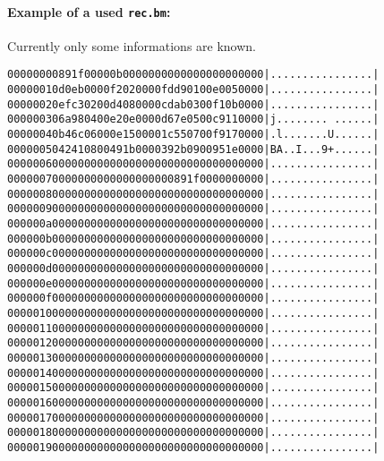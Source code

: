 \documentclass{scrartcl}
\begin{document}
\paragraph{Example of a used \texttt{rec.bm}:} Currently only some
informations are known.

{\small
\begin{alltt}
00000000  \textcolor{unknown}{89 1f 00 00} 0b 00 00 00  00 00 00 00 00 00 00 00  |................|
00000010  d0 eb 00 00 f2 02 00 00  fd d9 01 00 e0 05 00 00  |................|
00000020  ef c3 02 00 d4 08 00 00  cd ab 03 00 f1 0b 00 00  |................|
00000030  6a 98 04 00 e2 0e 00 00  d6 7e 05 00 c9 11 00 00  |j........~......|
00000040  b4 6c 06 00 0e 15 00 00  1c 55 07 00 f9 17 00 00  |.l.......U......|
00000050  42 41 08 00 49 1b 00 00  39 2b 09 00 95 1e 00 00  |BA..I...9+......|
00000060  00 00 00 00 00 00 00 00  00 00 00 00 00 00 00 00  |................|
00000070  00 00 00 00 00 00 00 00  00 \textcolor{unknown}{89 1f 00 00} 00 00 00  |................|
00000080  00 00 00 00 00 00 00 00  00 00 00 00 00 00 00 00  |................|
00000090  00 00 00 00 00 00 00 00  00 00 00 00 00 00 00 00  |................|
000000a0  00 00 00 00 00 00 00 00  00 00 00 00 00 00 00 00  |................|
000000b0  00 00 00 00 00 00 00 00  00 00 00 00 00 00 00 00  |................|
000000c0  00 00 00 00 00 00 00 00  00 00 00 00 00 00 00 00  |................|
000000d0  00 00 00 00 00 00 00 00  00 00 00 00 00 00 00 00  |................|
000000e0  00 00 00 00 00 00 00 00  00 00 00 00 00 00 00 00  |................|
000000f0  00 00 00 00 00 00 00 00  00 00 00 00 00 00 00 00  |................|
00000100  00 00 00 00 00 00 00 00  00 00 00 00 00 00 00 00  |................|
00000110  00 00 00 00 00 00 00 00  00 00 00 00 00 00 00 00  |................|
00000120  00 00 00 00 00 00 00 00  00 00 00 00 00 00 00 00  |................|
00000130  00 00 00 00 00 00 00 00  00 00 00 00 00 00 00 00  |................|
00000140  00 00 00 00 00 00 00 00  00 00 00 00 00 00 00 00  |................|
00000150  00 00 00 00 00 00 00 00  00 00 00 00 00 00 00 00  |................|
00000160  00 00 00 00 00 00 00 00  00 00 00 00 00 00 00 00  |................|
00000170  00 00 00 00 00 00 00 00  00 00 00 00 00 00 00 00  |................|
00000180  00 00 00 00 00 00 00 00  00 00 00 00 00 00 00 00  |................|
00000190  00 00 00 00 00 00 00 00  00 00 00 00 00 00 00 00  |................|
\end{alltt}
}
\end{document}
